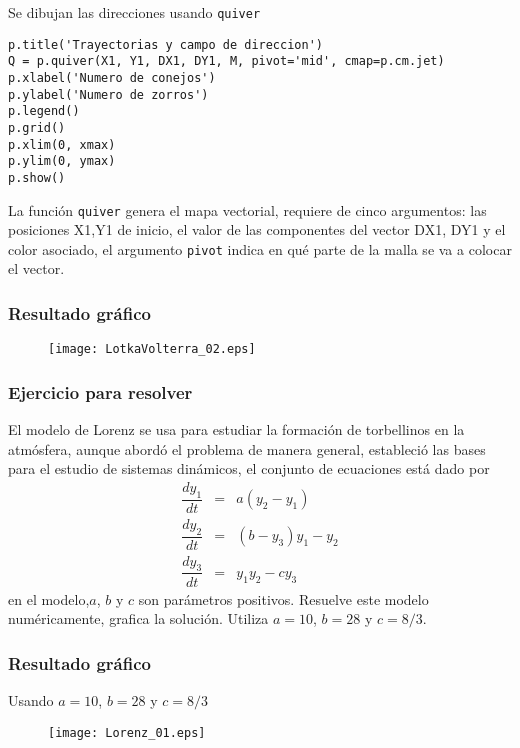 \begin{frame}[fragile]
Se dibujan las direcciones usando \texttt{quiver}
\begin{lstlisting}
p.title('Trayectorias y campo de direccion')
Q = p.quiver(X1, Y1, DX1, DY1, M, pivot='mid', cmap=p.cm.jet)
p.xlabel('Numero de conejos')
p.ylabel('Numero de zorros')
p.legend()
p.grid()
p.xlim(0, xmax)
p.ylim(0, ymax)
p.show()
\end{lstlisting}
La función \texttt{quiver} genera el mapa vectorial, requiere de cinco argumentos: las posiciones X1,Y1 de inicio, el valor de las componentes del vector DX1, DY1 y el color asociado, el argumento \texttt{pivot} indica en qué parte de la malla se va a colocar el vector.
\end{frame}
\begin{frame}
\frametitle{Resultado gráfico}
\begin{figure}
	\centering
	\texttt{[image: LotkaVolterra\_02.eps]} 
\end{figure}
\end{frame}
\begin{frame}
\frametitle{Ejercicio para resolver}
El modelo de Lorenz se usa para estudiar la formación de torbellinos en la atmósfera, aunque abordó el problema de manera general, estableció las bases para el estudio de sistemas dinámicos, el conjunto de ecuaciones está dado por
\begin{eqnarray*}
\dfrac{dy_{1}}{dt} &=& a(y_{2}-y_{1}) \\
\dfrac{dy_{2}}{dt} &=& (b - y_{3})y_{1} - y_{2} \\
\dfrac{dy_{3}}{dt} &=& y_{1}y_{2} - cy_{3}
\end{eqnarray*}
en el modelo,$a$, $b$ y $c$ son parámetros positivos. Resuelve este modelo numéricamente, grafica la solución. Utiliza $a = 10$, $b= 28$ y $c=8/3$.
\end{frame}
\begin{frame}
\frametitle{Resultado gráfico}
Usando $a = 10$, $b= 28$ y $c=8/3$
\begin{figure}
	\centering
	\texttt{[image: Lorenz\_01.eps]} 
\end{figure}
\end{frame}

